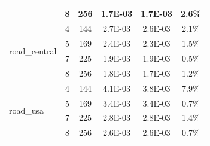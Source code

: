 \documentclass[conference, 10ppt]{IEEEtran}
\begin{document}
\begin{table}[htb]
\begin{tabular}[c]{| l | c | c | c | c | c |}
  &  8  &  256  &  1.7E-03  &  1.7E-03  &  2.6\% \\ \hline
\multirow{4}{*}{road\_central}  &  4  &  144  &  2.7E-03  &  2.6E-03  &  2.1\% \\ \cline{2-6}
  &  5  &  169  &  2.4E-03  &  2.3E-03  &  1.5\% \\ \cline{2-6}
  &  7  &  225  &  1.9E-03  &  1.9E-03  &  0.5\% \\ \cline{2-6}
  &  8  &  256  &  1.8E-03  &  1.7E-03  &  1.2\% \\ \hline
\multirow{4}{*}{road\_usa}  &  4  &  144  &  4.1E-03  &  3.8E-03  &  7.9\% \\ \cline{2-6}
  &  5  &  169  &  3.4E-03  &  3.4E-03  &  0.7\% \\ \cline{2-6}
  &  7  &  225  &  2.8E-03  &  2.8E-03  &  1.4\% \\ \cline{2-6}
  &  8  &  256  &  2.6E-03  &  2.6E-03  &  0.7\% \\ \hline
\end{tabular}
\end{table}
\end{document}
